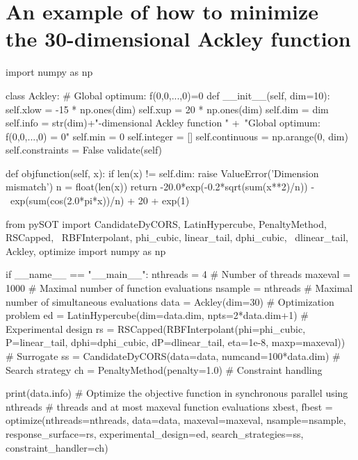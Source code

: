 \documentclass[]{article}
\begin{document}
\section{An example of how to minimize the 30-dimensional Ackley function}
\begin{python}
import numpy as np

class Ackley:
    #  Global optimum: f(0,0,...,0)=0
    def __init__(self, dim=10):
        self.xlow = -15 * np.ones(dim)
        self.xup = 20 * np.ones(dim)
        self.dim = dim
        self.info = str(dim)+"-dimensional Ackley function \n" +\
                             "Global optimum: f(0,0,...,0) = 0"
        self.min = 0
        self.integer = []
        self.continuous = np.arange(0, dim)
        self.constraints = False
        validate(self)

    def objfunction(self, x):
        if len(x) != self.dim:
            raise ValueError('Dimension mismatch')
        n = float(len(x))
        return -20.0*exp(-0.2*sqrt(sum(x**2)/n)) - \
            exp(sum(cos(2.0*pi*x))/n) + 20 + exp(1)
\end{python}

\begin{python}
from pySOT import CandidateDyCORS,  LatinHypercube, PenaltyMethod, RSCapped, \
                  RBFInterpolant, phi_cubic, linear_tail, dphi_cubic, \
	          dlinear_tail, Ackley, optimize
import numpy as np

if __name__ == "__main__":
    nthreads = 4  # Number of threads
    maxeval = 1000  # Maximal number of function evaluations
    nsample = nthreads  # Maximal number of simultaneous evaluations
    data = Ackley(dim=30)  # Optimization problem
    ed = LatinHypercube(dim=data.dim, npts=2*data.dim+1)  # Experimental design
    rs = RSCapped(RBFInterpolant(phi=phi_cubic, P=linear_tail,
                                 dphi=dphi_cubic, dP=dlinear_tail,
                                 eta=1e-8, maxp=maxeval))  # Surrogate
    ss = CandidateDyCORS(data=data, numcand=100*data.dim)  # Search strategy
    ch = PenaltyMethod(penalty=1.0)  # Constraint handling

    print(data.info)
    # Optimize the objective function in synchronous parallel using nthreads
    # threads and at most maxeval function evaluations
    xbest, fbest = optimize(nthreads=nthreads, data=data, maxeval=maxeval,
                            nsample=nsample, response_surface=rs,
                            experimental_design=ed, search_strategies=ss,
                            constraint_handler=ch)
\end{python}
\end{document}
